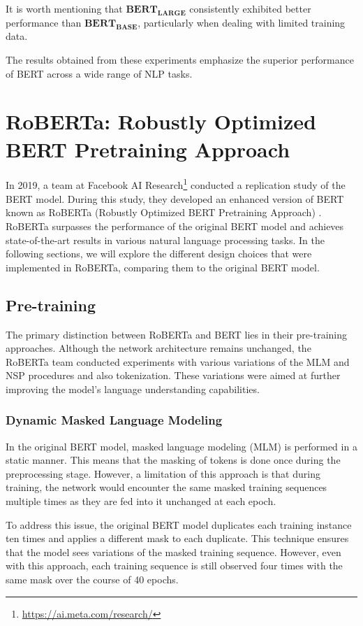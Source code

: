 \documentclass[a4paper,10pt]{report}
\begin{document}
It is worth mentioning that $\mathbf{BERT_{LARGE}}$ consistently exhibited better performance than $\mathbf{BERT_{BASE}}$, particularly when dealing with limited training data.

The results obtained from these experiments emphasize the superior performance of BERT across a wide range of NLP tasks. \cite{bert}

\section{RoBERTa: Robustly Optimized BERT Pretraining Approach}
In 2019, a team at Facebook AI Research\footnote{\url{https://ai.meta.com/research/}} conducted a replication study of the BERT model. During this study, they developed an enhanced version of BERT known as RoBERTa (Robustly Optimized BERT Pretraining Approach) \cite{roberta}. RoBERTa surpasses the performance of the original BERT model and achieves state-of-the-art results in various natural language processing tasks. In the following sections, we will explore the different design choices that were implemented in RoBERTa, comparing them to the original BERT model.

\subsection{Pre-training}
The primary distinction between RoBERTa and BERT lies in their pre-training approaches. Although the network architecture remains unchanged, the RoBERTa team conducted experiments with various variations of the MLM and NSP procedures and also tokenization. These variations were aimed at further improving the model's language understanding capabilities. \cite{roberta}

\subsubsection{Dynamic Masked Language Modeling}
In the original BERT model, masked language modeling (MLM) is performed in a static manner. This means that the masking of tokens is done once during the preprocessing stage. However, a limitation of this approach is that during training, the network would encounter the same masked training sequences multiple times as they are fed into it unchanged at each epoch.

To address this issue, the original BERT model duplicates each training instance ten times and applies a different mask to each duplicate. This technique ensures that the model sees variations of the masked training sequence. However, even with this approach, each training sequence is still observed four times with the same mask over the course of 40 epochs.
\end{document}

